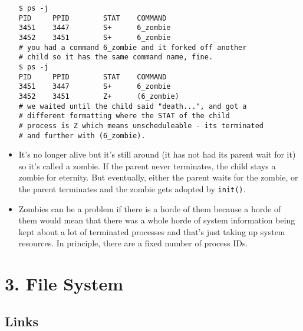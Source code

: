 \documentclass[]{article}
\begin{document}
\begin{itemize}
\begin{verbatim}
$ ps -j
PID		PPID		STAT	COMMAND
3451	3447		S+		6_zombie
3452	3451		S+ 		6_zombie		
# you had a command 6_zombie and it forked off another 
# child so it has the same command name, fine.
$ ps -j
PID		PPID		STAT	COMMAND
3451	3447		S+		6_zombie
3452	3451		Z+		(6_zombie)
# we waited until the child said "death...", and got a 
# different formatting where the STAT of the child 
# process is Z which means unscheduleable - its terminated
# and further with (6_zombie). 
\end{verbatim}
\item
  It's no longer alive but it's still around (it has not had its parent
  wait for it) so it's called a zombie. If the parent never terminates,
  the child stays a zombie for eternity. But eventually, either the
  parent waits for the zombie, or the parent terminates and the zombie
  gets adopted by \texttt{init()}. 
\item
  Zombies can be a problem if there is a horde of them because a horde
  of them would mean that there was a whole horde of system information
  being kept about a lot of terminated processes and that's just taking
  up system resources. In principle, there are a fixed number of process
  IDs. 
\end{itemize}

\section{\texorpdfstring{\textbf{3. File
System}}{3. File System}}\label{header-n260}

\subsection{\texorpdfstring{\textbf{Links}}{Links}}\label{header-n261}
\end{document}
